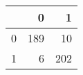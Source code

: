 \begin{tabular}{lrr}
\toprule
{} &    0 &    1 \\
\midrule
0 &  189 &   10 \\
1 &    6 &  202 \\
\bottomrule
\end{tabular}
